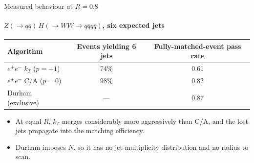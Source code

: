 \documentclass[aspectratio=169,10pt]{beamer}
\newcommand{\ee}{$e^{+}e^{-}$}
\newcommand{\Cdur}[1]{\textcolor{pfblue}{#1}}
\newcommand{\Cca}[1]{\textcolor{caviolet}{#1}}
\newcommand{\Ckt}[1]{\textcolor{ktamberink}{#1}}
\begin{document}
\begin{frame}{Measured behaviour at \texorpdfstring{$R = 0.8$}{R = 0.8}}
  \framesubtitle{$Z(\to q\bar{q})\,H(\to WW \to q\bar{q}q\bar{q})$, six expected jets}

  \begin{center}
  \small
  \begin{tabular}{@{}lcc@{}}
    \toprule
    Algorithm & Events yielding 6 jets & Fully-matched-event pass rate \\
    \midrule
    \Ckt{\ee{} $k_T$ ($p=+1$)}            & 74\% & 0.61 \\
    \Cca{\ee{} C/A ($p=0$)}               & 98\% & 0.82 \\
    \Cdur{Durham (exclusive)}             & ---  & 0.87 \\
    \bottomrule
  \end{tabular}
  \end{center}

  \medskip
  \begin{itemize}
    \item At equal $R$, $k_T$ merges considerably more aggressively than C/A,
          and the lost jets propagate into the matching efficiency.
    \item Durham imposes $N$, so it has no jet-multiplicity distribution and no
          radius to scan.
  \end{itemize}
\end{frame}
\end{document}
